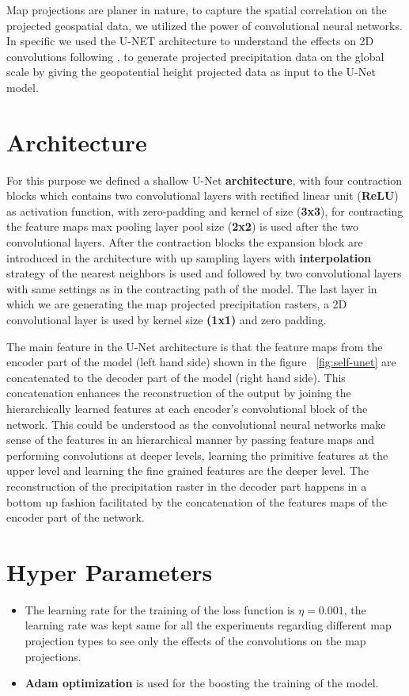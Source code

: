 Map projections are planer in nature, to capture the spatial correlation on the projected geospatial data, we utilized the power of convolutional neural networks.
In specific we used the U-NET \cite{ronneberger2015unet}  architecture to understand the effects on 2D convolutions following \cite{trebing2021smaatunet}, to generate projected precipitation data on the global scale by giving the geopotential height projected data as input to the U-Net model.

\section{Architecture}
For this purpose we defined a shallow U-Net \textbf{architecture}, with four contraction blocks which contains two convolutional layers with rectified linear unit (\textbf{ReLU})
as activation function, with zero-padding and kernel of size (\textbf{3x3}), for contracting the feature maps max pooling layer pool size (\textbf{2x2}) is used after the two
convolutional layers.
After the contraction blocks the expansion block are introduced in the architecture with up sampling layers with \textbf{interpolation} strategy of the nearest neighbors is used
and followed by two convolutional layers with same settings as in the contracting path of the model.
The last layer in which we are generating the map projected precipitation rasters, a 2D convolutional layer is used by kernel size  \textbf{(1x1)} and zero padding.

The main feature in the U-Net architecture is that the feature maps from the encoder part of the model (left hand side) shown in the figure ~\ref{fig:self-unet} are concatenated to the decoder part of the model (right hand side).
This concatenation enhances the reconstruction of the output by joining the hierarchically learned features at each encoder's convolutional block of the network. This could be
understood as the convolutional neural networks make sense of the features in an hierarchical manner by passing feature maps and performing convolutions at deeper levels,
learning the primitive features at the upper level and learning the fine grained features are the deeper level. The reconstruction of the precipitation raster in the decoder
part happens in a bottom up fashion facilitated by the concatenation of the features maps of the encoder part of the network.

\section{Hyper Parameters}
\begin{itemize}
    \item The learning rate for the training of the loss function is $\eta = 0.001$, the learning rate was kept same for all the experiments regarding different map projection types to see only the effects of the convolutions on the map projections.
    \item \textbf{Adam optimization} is used for the boosting the training of the model.
\end{itemize}

